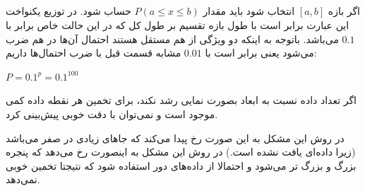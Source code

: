\documentclass[a4paper,14pt]{extarticle}
\begin{document}
\subsection{}
اگر بازه 
$[a, b]$
انتخاب شود باید مقدار 
$P(a \leq x \leq b)$
حساب شود. در توزیع یکنواخت این عبارت برابر است با طول بازه تقسیم بر طول کل که در این حالت خاص برابر با 
$0.1$
می‌باشد.
باتوجه به اینکه دو ویژگی از هم مستقل هستند احتمال آن‌ها در هم ضرب می‌شود یعنی برابر است با 
$0.01$
مشابه قسمت قبل با ضرب احتمال‌ها داریم:
\begin{latin}
	$
	P = 0.1 ^ p = 0.1^100
	$
\end{latin}
اگر تعداد داده نسبت به ابعاد بصورت نمایی رشد نکند، برای تخمین هر نقطه داده کمی موجود است و نمی‌توان با دقت خوبی پیش‌بینی کرد.

در روش 
این مشکل به این صورت رخ پیدا می‌کند که جاهای زیادی در 
صفر می‌باشد (زیرا داده‌ای یافت نشده است.)
در روش 
این مشکل به اینصورت رخ می‌دهد که پنجره بزرگ و بزرگ تر می‌شود و احتمالا از داده‌های دور استفاده شود که نتیجتا تخمین خوبی نمی‌دهد.
\end{document}
